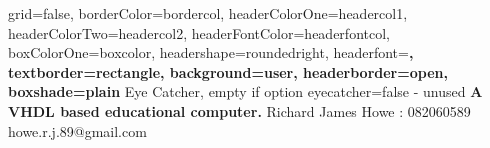 \documentclass[a1paper,portrait]{baposter}
\begin{document}
\begin{poster}{
  grid=false,
  borderColor=bordercol,
  headerColorOne=headercol1,
  headerColorTwo=headercol2,
  headerFontColor=headerfontcol,
  boxColorOne=boxcolor,
  headershape=roundedright,
  headerfont=\Large\sf\bf,
  textborder=rectangle,
  background=user,
  headerborder=open,
  boxshade=plain
}
{
  Eye Catcher, empty if option eyecatcher=false - unused
}
{\sf\bf
  A VHDL based educational computer.
}
{
  \vspace{1em} Richard James Howe : 082060589\\
  {\smaller howe.r.j.89@gmail.com}
}
{
\setlength\fboxsep{0pt}
\setlength\fboxrule{0.5pt}
}



\end{poster}
\end{document}
